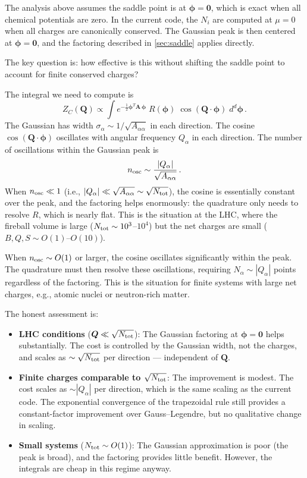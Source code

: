 \documentclass[11pt,a4paper]{article}
\newcommand{\bphi}{\bm{\phi}}
\newcommand{\bQ}{\bm{Q}}
\newcommand{\bA}{\bm{A}}
\begin{document}
The analysis above assumes the saddle point is at $\bphi = \bm{0}$, which is exact when all chemical potentials are zero.
In the current code, the $N_i$ are computed at $\mu = 0$ when all charges are canonically conserved.
The Gaussian peak is then centered at $\bphi = \bm{0}$, and the factoring described in \cref{sec:saddle} applies directly.

The key question is: how effective is this without shifting the saddle point to account for finite conserved charges?

The integral we need to compute is
\begin{equation}
  Z_C(\bQ) \propto \int e^{-\frac{1}{2}\bphi^T \bA\,\bphi}\;R(\bphi)\;\cos(\bQ \cdot \bphi)\;d^d\bphi\,.
\end{equation}
The Gaussian has width $\sigma_\alpha \sim 1/\sqrt{A_{\alpha\alpha}}$ in each direction.
The cosine $\cos(\bQ \cdot \bphi)$ oscillates with angular frequency $Q_\alpha$ in each direction.
The number of oscillations within the Gaussian peak is
\begin{equation}\label{eq:n-osc}
  n_{\rm osc} \sim \frac{|Q_\alpha|}{\sqrt{A_{\alpha\alpha}}}\,.
\end{equation}
When $n_{\rm osc} \ll 1$ (i.e., $|Q_\alpha| \ll \sqrt{A_{\alpha\alpha}} \sim \sqrt{N_{\rm tot}}$), the cosine is essentially constant over the peak, and the factoring helps enormously: the quadrature only needs to resolve $R$, which is nearly flat.
This is the situation at the LHC, where the fireball volume is large ($N_{\rm tot} \sim 10^3$--$10^4$) but the net charges are small ($B, Q, S \sim O(1)$--$O(10)$).

When $n_{\rm osc} \sim O(1)$ or larger, the cosine oscillates significantly within the peak.
The quadrature must then resolve these oscillations, requiring $N_\alpha \sim |Q_\alpha|$ points regardless of the factoring.
This is the situation for finite systems with large net charges, e.g., atomic nuclei or neutron-rich matter.

The honest assessment is:
\begin{itemize}
  \item \textbf{LHC conditions} ($\bQ \ll \sqrt{N_{\rm tot}}$): The Gaussian factoring at $\bphi = \bm{0}$ helps substantially.
  The cost is controlled by the Gaussian width, not the charges, and scales as $\sim \sqrt{N_{\rm tot}}$ per direction --- independent of $\bQ$.
  \item \textbf{Finite charges comparable to $\sqrt{N_{\rm tot}}$}: The improvement is modest.
  The cost scales as $\sim |Q_\alpha|$ per direction, which is the same scaling as the current code.
  The exponential convergence of the trapezoidal rule still provides a constant-factor improvement over Gauss--Legendre, but no qualitative change in scaling.
  \item \textbf{Small systems} ($N_{\rm tot} \sim O(1)$): The Gaussian approximation is poor (the peak is broad), and the factoring provides little benefit.
  However, the integrals are cheap in this regime anyway.
\end{itemize}
\end{document}
